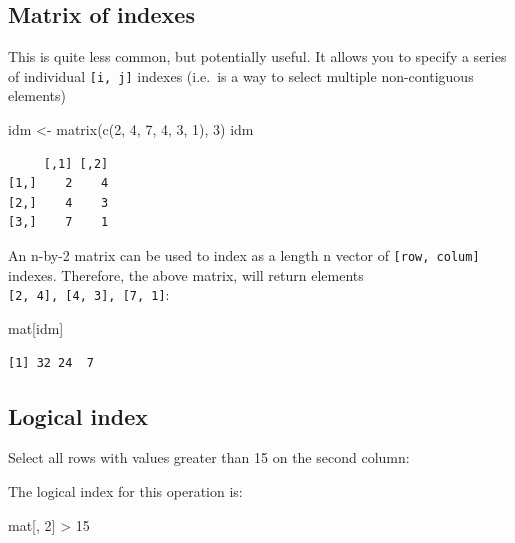 \documentclass[
]{book}
\newenvironment{Shaded}{\begin{snugshade}}{\end{snugshade}}
\newcommand{\DecValTok}[1]{\textcolor[rgb]{0.00,0.00,0.81}{#1}}
\newcommand{\FunctionTok}[1]{\textcolor[rgb]{0.00,0.00,0.00}{#1}}
\newcommand{\NormalTok}[1]{#1}
\newcommand{\OtherTok}[1]{\textcolor[rgb]{0.56,0.35,0.01}{#1}}
\newcommand{\SpecialCharTok}[1]{\textcolor[rgb]{0.00,0.00,0.00}{#1}}
\begin{document}
\hypertarget{matrix-of-indexes}{%
\subsection{Matrix of indexes}\label{matrix-of-indexes}}

This is quite less common, but potentially useful. It allows you to specify a series of individual \texttt{{[}i,\ j{]}} indexes (i.e.~is a way to select multiple non-contiguous elements)

\begin{Shaded}
\begin{Highlighting}[]
\NormalTok{idm }\OtherTok{\textless{}{-}} \FunctionTok{matrix}\NormalTok{(}\FunctionTok{c}\NormalTok{(}\DecValTok{2}\NormalTok{, }\DecValTok{4}\NormalTok{, }\DecValTok{7}\NormalTok{, }\DecValTok{4}\NormalTok{, }\DecValTok{3}\NormalTok{, }\DecValTok{1}\NormalTok{), }\DecValTok{3}\NormalTok{)}
\NormalTok{idm}
\end{Highlighting}
\end{Shaded}

\begin{verbatim}
     [,1] [,2]
[1,]    2    4
[2,]    4    3
[3,]    7    1
\end{verbatim}

An n-by-2 matrix can be used to index as a length n vector of \texttt{{[}row,\ colum{]}} indexes. Therefore, the above matrix, will return elements \texttt{{[}2,\ 4{]},\ {[}4,\ 3{]},\ {[}7,\ 1{]}}:

\begin{Shaded}
\begin{Highlighting}[]
\NormalTok{mat[idm]}
\end{Highlighting}
\end{Shaded}

\begin{verbatim}
[1] 32 24  7
\end{verbatim}

\hypertarget{matidl}{%
\subsection{Logical index}\label{matidl}}

Select all rows with values greater than 15 on the second column:

The logical index for this operation is:

\begin{Shaded}
\begin{Highlighting}[]
\NormalTok{mat[, }\DecValTok{2}\NormalTok{] }\SpecialCharTok{\textgreater{}} \DecValTok{15}
\end{Highlighting}
\end{Shaded}
\end{document}
